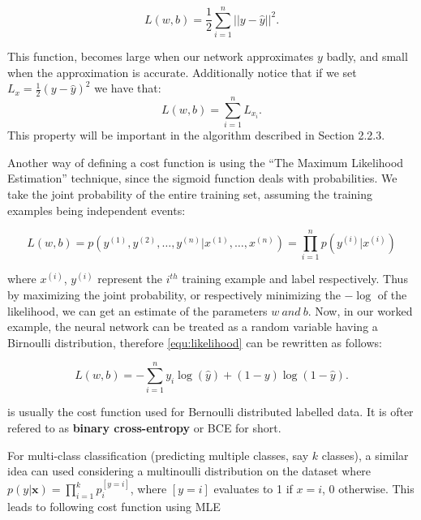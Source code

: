 \begin{equation}
  \label{equ:mse}
  L(w, b) = \frac{1}{2} \sum_{i = 1}^{n} ||y - \hat{y}||^2.
\end{equation}

This function, becomes large when our network approximates $y$ badly, and small when the approximation is accurate. Additionally notice that if we set $L_x = \frac{1}{2} (y - \hat{y})^2$ we have that:
\begin{equation}
  \label{equ:additivity}
  L(w,b) = \sum_{i = 1}^{n} L_{x_{i}}.
\end{equation}
This property will be important in the algorithm described in Section 2.2.3.

Another way of defining a cost function is using the ``The Maximum Likelihood Estimation'' technique, since the sigmoid function deals with probabilities. We take the joint probability of the entire training set, assuming the training examples being independent events:

\begin{equation}
  \label{equ:likelihood}
  L(w, b) = p(y^{(1)}, y^{(2)}, \ldots, y^{(n)} | x^{(1)}, \ldots, x^{(n)}) = \prod_{i=1}^{n} p(y^{(i)}|x^{(i)})
\end{equation}

where $x^{(i)}$, $y^{(i)}$ represent the $i^{th}$ training example and label respectively. Thus by maximizing the joint probability, or respectively minimizing the $-\log$ of the likelihood, we can get an estimate of the parameters $w \ and \ b $. Now, in our worked example, the neural network can be treated as a random variable having a Birnoulli distribution, therefore \cref{equ:likelihood} can be rewritten as follows:

\begin{equation}
  \label{equ:b_likelihood}
  L(w, b) = - \sum_{i = 1}^{n} y_i \log(\hat{y}) + (1 - y) \log(1 - \hat{y}).
\end{equation}

 is usually the cost function used for Bernoulli distributed labelled data. It is ofter refered to as \textbf{binary cross-entropy} or BCE for short.

For multi-class classification (predicting multiple classes, say $k$ classes), a similar idea can used considering a multinoulli distribution on the dataset where $p(y | \textbf{x}) = \prod_{i = 1}^{k} p_i^{[y=i]}$, where $[y = i]$ evaluates to 1 if $x = i$, 0 otherwise. This leads to following cost function using MLE


